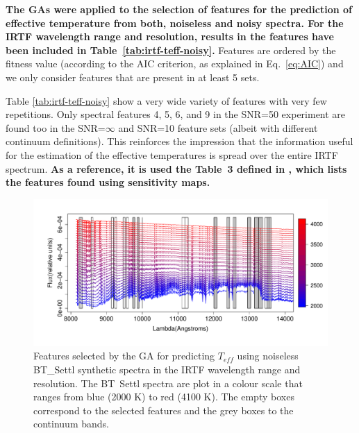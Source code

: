 \textbf{
The GAs were applied to the selection of features for the
prediction of effective temperature from both, noiseless and noisy spectra.
For the IRTF wavelength range and resolution, results in the features have been included
in Table~\ref{tab:irtf-teff-noisy}. 
}
Features are ordered by the
fitness value (according to the AIC criterion, as explained in Eq.~\ref{eq:AIC}) and 
we only consider features that are present in at least 5 sets.


Table %
\ref{tab:irtf-teff-noisy}
show a very wide variety of features with very few repetitions. Only
spectral features 4, 5, 6, and 9 in the SNR=50 experiment are found
too in the SNR=$\infty$ and SNR=10 feature sets (albeit with different
continuum definitions). This reinforces the impression that the
information useful for the estimation of the effective temperatures is
spread over the entire IRTF spectrum.
\textbf{
As a reference, it is used the Table~3 defined in \cite{cesetti}, which
lists the features found using sensitivity maps.
}

\begin{figure}
\includegraphics[width=\textwidth]{figs/BT-spectraAtIRTF-Inf-teff2}
 \caption{Features selected by the GA for predicting $T_{eff}$ using
    noiseless BT\_Settl synthetic spectra in the IRTF wavelength range
    and resolution. The BT\ Settl spectra are plot in a colour scale
    that ranges from blue (2000 K) to red (4100 K). The empty boxes
    correspond to the selected features and the grey boxes to the
    continuum bands.}  \label{fig:IRTF-teff}
\end{figure}


